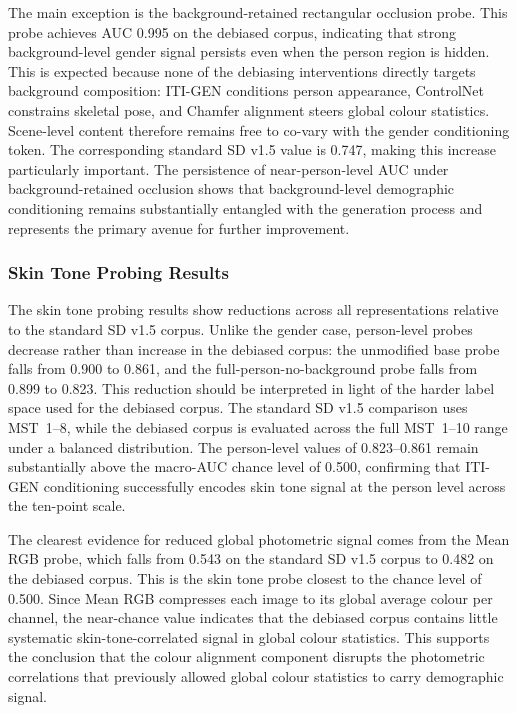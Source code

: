 The main exception is the background-retained rectangular occlusion probe. This probe achieves AUC 0.995 on the debiased corpus, indicating that strong background-level gender signal persists even when the person region is hidden. This is expected because none of the debiasing interventions directly targets background composition: ITI-GEN conditions person appearance, ControlNet constrains skeletal pose, and Chamfer alignment steers global colour statistics. Scene-level content therefore remains free to co-vary with the gender conditioning token. The corresponding standard SD v1.5 value is 0.747, making this increase particularly important. The persistence of near-person-level AUC under background-retained occlusion shows that background-level demographic conditioning remains substantially entangled with the generation process and represents the primary avenue for further improvement.


\subsubsection{Skin Tone Probing Results}

The skin tone probing results show reductions across all representations relative to the standard SD v1.5 corpus. Unlike the gender case, person-level probes decrease rather than increase in the debiased corpus: the unmodified base probe falls from 0.900 to 0.861, and the full-person-no-background probe falls from 0.899 to 0.823. This reduction should be interpreted in light of the harder label space used for the debiased corpus. The standard SD v1.5 comparison uses MST~1--8, while the debiased corpus is evaluated across the full MST~1--10 range under a balanced distribution. The person-level values of 0.823--0.861 remain substantially above the macro-AUC chance level of 0.500, confirming that ITI-GEN conditioning successfully encodes skin tone signal at the person level across the ten-point scale.

The clearest evidence for reduced global photometric signal comes from the Mean RGB probe, which falls from 0.543 on the standard SD v1.5 corpus to 0.482 on the debiased corpus. This is the skin tone probe closest to the chance level of 0.500. Since Mean RGB compresses each image to its global average colour per channel, the near-chance value indicates that the debiased corpus contains little systematic skin-tone-correlated signal in global colour statistics. This supports the conclusion that the colour alignment component disrupts the photometric correlations that previously allowed global colour statistics to carry demographic signal.

